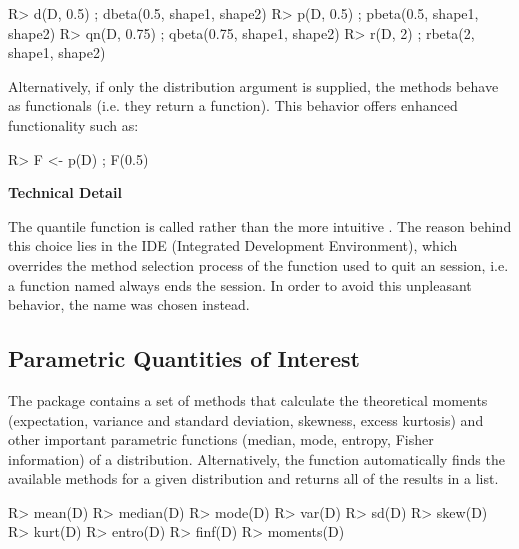 \documentclass[nojss]{jss}
\newcommand{\fct}[1]{\code{#1()}}
\begin{document}
\begin{CodeChunk}
\begin{CodeInput}
R> d(D, 0.5) ; dbeta(0.5, shape1, shape2)
R> p(D, 0.5) ; pbeta(0.5, shape1, shape2)
R> qn(D, 0.75) ; qbeta(0.75, shape1, shape2)
R> r(D, 2) ; rbeta(2, shape1, shape2)
\end{CodeInput}
\end{CodeChunk}

Alternatively, if only the distribution argument is supplied, the methods behave as functionals (i.e. they return a function). This behavior offers enhanced functionality such as:

\begin{CodeChunk}
\begin{CodeInput}
R> F <- p(D) ; F(0.5)
\end{CodeInput}
\end{CodeChunk}

\begin{leftbar}
\textbf{Technical Detail}

The quantile function is called \fct{qn} rather than the more intuitive \fct{q}. The reason behind this choice lies in the  IDE (Integrated Development Environment), which overrides the method selection process of the  function \fct{q} used to quit an  session, i.e. a function named \fct{q} always ends the session. In order to avoid this unpleasant behavior, the name \fct{qn} was chosen instead.
\end{leftbar}

\subsection[Parametric Quantities of Interest]{Parametric Quantities of Interest} \label{ss:moments}

The  package contains a set of methods that calculate the theoretical moments (expectation, variance and standard deviation, skewness, excess kurtosis) and other important parametric functions (median, mode, entropy, Fisher information) of a distribution. Alternatively, the \fct{moments} function automatically finds the available methods for a given distribution and returns all of the results in a list.

\begin{CodeChunk}
\begin{CodeInput}
R> mean(D)
R> median(D)
R> mode(D)
R> var(D)
R> sd(D)
R> skew(D)
R> kurt(D)
R> entro(D)
R> finf(D)
R> moments(D)
\end{CodeInput}
\end{CodeChunk}
\end{document}
